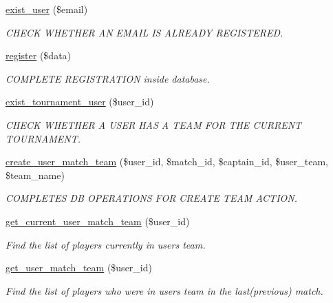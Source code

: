 \begin{DoxyCompactItemize}
\hyperlink{class_user__model_af5353bd19166d507ea0c767d075e41b9}{exist\+\_\+user} (\$email)
\begin{DoxyCompactList}\small\item\em C\+H\+E\+C\+K W\+H\+E\+T\+H\+E\+R A\+N E\+M\+A\+I\+L I\+S A\+L\+R\+E\+A\+D\+Y R\+E\+G\+I\+S\+T\+E\+R\+E\+D. \end{DoxyCompactList}\item 
\hyperlink{class_user__model_ad2bc607329e3fa62d3b95a76e61b650c}{register} (\$data)
\begin{DoxyCompactList}\small\item\em C\+O\+M\+P\+L\+E\+T\+E R\+E\+G\+I\+S\+T\+R\+A\+T\+I\+O\+N inside database. \end{DoxyCompactList}\item 
\hyperlink{class_user__model_a846e1bae3454d58b9a972b12946a046b}{exist\+\_\+tournament\+\_\+user} (\$user\+\_\+id)
\begin{DoxyCompactList}\small\item\em C\+H\+E\+C\+K W\+H\+E\+T\+H\+E\+R A U\+S\+E\+R H\+A\+S A T\+E\+A\+M F\+O\+R T\+H\+E C\+U\+R\+R\+E\+N\+T T\+O\+U\+R\+N\+A\+M\+E\+N\+T. \end{DoxyCompactList}\item 
\hyperlink{class_user__model_a726f155ee806607ba991a97309bd1f4b}{create\+\_\+user\+\_\+match\+\_\+team} (\$user\+\_\+id, \$match\+\_\+id, \$captain\+\_\+id, \$user\+\_\+team, \$team\+\_\+name)
\begin{DoxyCompactList}\small\item\em C\+O\+M\+P\+L\+E\+T\+E\+S D\+B O\+P\+E\+R\+A\+T\+I\+O\+N\+S F\+O\+R C\+R\+E\+A\+T\+E T\+E\+A\+M A\+C\+T\+I\+O\+N. \end{DoxyCompactList}\item 
\hyperlink{class_user__model_a0a5579784d72aa25f657b1577140ff4f}{get\+\_\+current\+\_\+user\+\_\+match\+\_\+team} (\$user\+\_\+id)
\begin{DoxyCompactList}\small\item\em Find the list of players currently in user\textquotesingle{}s team. \end{DoxyCompactList}\item 
\hyperlink{class_user__model_a540a77bb05918a80bb54e43b44618fc2}{get\+\_\+user\+\_\+match\+\_\+team} (\$user\+\_\+id)
\begin{DoxyCompactList}\small\item\em Find the list of players who were in user\textquotesingle{}s team in the last(previous) match. \end{DoxyCompactList}\item 

\end{DoxyCompactItemize}
